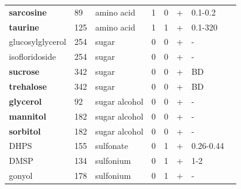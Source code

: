 \documentclass[utf8]{frontiersSCNS} %
\begin{document}
\begin{landscape}
\begin{table}[]
\begin{tabular}{llllllll}
\textbf{sarcosine}            & 89             & amino acid        & 1                & 0                & +                 & 0.1-0.2 \citep{Widner2021}              \\
\textbf{taurine}              & 125            & amino acid        & 1                & 1                & +                 & 0.1-320 \citep{Widner2021,Clifford2017} \\
glucosylglycerol     & 254            & sugar             & 0                & 0                & +                 & -                                        \\
isofloridoside       & 254            & sugar             & 0                & 0                & +                 & -                                         \\
\textbf{sucrose}              & 342            & sugar             & 0                & 0                & +                 & BD \citep{Sakugawa1985}                                         \\
\textbf{trehalose}            & 342            & sugar             & 0                & 0                & +                 & BD \citep{Sakugawa1985}                                         \\
\textbf{glycerol}             & 92             & sugar alcohol     & 0                & 0                & +                 & -                                          \\
\textbf{mannitol}             & 182            & sugar alcohol     & 0                & 0                & +                 & -                                          \\
\textbf{sorbitol}             & 182            & sugar alcohol     & 0                & 0                & +                 & -                                          \\
DHPS                 & 155            & sulfonate         & 0                & 1                & +                 & 0.26-0.44 \citep{Widner2021}              \\
DMSP                 & 134            & sulfonium         & 0                & 1                & +                 & 1-2 \citep{Kiene2006}               \\
gonyol               & 178            & sulfonium         & 0                & 1                & +                 & -                                                                         
\end{tabular}

\end{table}
\end{landscape}
\end{document}
